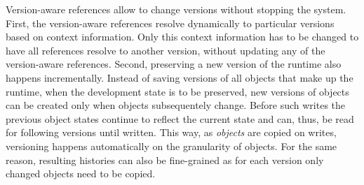 


Version-aware references allow to change versions without stopping the system.
First, the version-aware references resolve dynamically to particular versions based on context information.
Only this context information has to be changed to have all references resolve to another version, without updating any of the version-aware references.
Second, preserving a new version of the runtime also happens incrementally.
Instead of saving versions of all objects that make up the runtime, when the development state is to be preserved, new versions of objects can be created only when objects subsequentely change.
Before such writes the previous object states continue to reflect the current state and can, thus, be read for following versions until written.
This way, as \emph{objects} are copied on writes, versioning happens automatically on the granularity of objects.
For the same reason, resulting histories can also be fine-grained as for each version only changed objects need to be copied.



